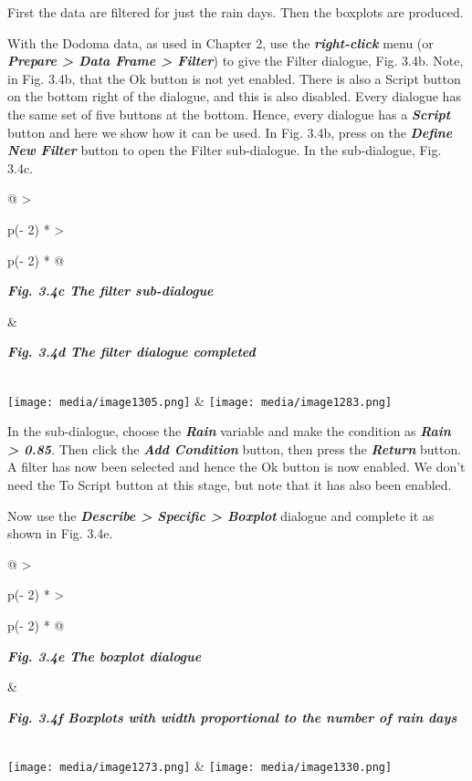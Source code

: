 \documentclass[
  letterpaper,
  DIV=11,
  numbers=noendperiod]{scrreprt}
\begin{document}
First the data are filtered for just the rain days. Then the boxplots
are produced.

With the Dodoma data, as used in Chapter 2, use the
\textbf{\emph{right-click}} menu (or \textbf{\emph{Prepare
\textgreater{} Data Frame \textgreater{} Filter}}) to give the Filter
dialogue, Fig. 3.4b. Note, in Fig. 3.4b, that the Ok button is not yet
enabled. There is also a Script button on the bottom right of the
dialogue, and this is also disabled. Every dialogue has the same set of
five buttons at the bottom. Hence, every dialogue has a
\textbf{\emph{Script}} button and here we show how it can be used. In
Fig. 3.4b, press on the \textbf{\emph{Define New Filter}} button to open
the Filter sub-dialogue. In the sub-dialogue, Fig. 3.4c.

\begin{longtable}[]{@{}
  >{\raggedright\arraybackslash}p{(\columnwidth - 2\tabcolsep) * }
  >{\raggedright\arraybackslash}p{(\columnwidth - 2\tabcolsep) * }@{}}
\toprule\noalign{}
\begin{minipage}[b]{\linewidth}\raggedright
\textbf{\emph{Fig. 3.4c The filter sub-dialogue}}
\end{minipage} & \begin{minipage}[b]{\linewidth}\raggedright
\textbf{\emph{Fig. 3.4d The filter dialogue completed}}
\end{minipage} \\
\midrule\noalign{}
\endhead
\bottomrule\noalign{}
\endlastfoot
\texttt{[image: media/image1305.png]}
&
\texttt{[image: media/image1283.png]} \\
\end{longtable}

In the sub-dialogue, choose the \textbf{\emph{Rain}} variable and make
the condition as \textbf{\emph{Rain \textgreater{} 0.85}}. Then click
the \textbf{\emph{Add Condition}} button, then press the
\textbf{\emph{Return}} button. A filter has now been selected and hence
the Ok button is now enabled. We don't need the To Script button at this
stage, but note that it has also been enabled.

Now use the \textbf{\emph{Describe \textgreater{} Specific
\textgreater{} Boxplot}} dialogue and complete it as shown in Fig. 3.4e.

\begin{longtable}[]{@{}
  >{\raggedright\arraybackslash}p{(\columnwidth - 2\tabcolsep) * }
  >{\raggedright\arraybackslash}p{(\columnwidth - 2\tabcolsep) * }@{}}
\toprule\noalign{}
\begin{minipage}[b]{\linewidth}\raggedright
\textbf{\emph{Fig. 3.4e The boxplot dialogue}}
\end{minipage} & \begin{minipage}[b]{\linewidth}\raggedright
\textbf{\emph{Fig. 3.4f Boxplots with width proportional to the number
of rain days}}
\end{minipage} \\
\midrule\noalign{}
\endhead
\bottomrule\noalign{}
\endlastfoot
\texttt{[image: media/image1273.png]}
& \texttt{[image: media/image1330.png]} \\
\end{longtable}
\end{document}
